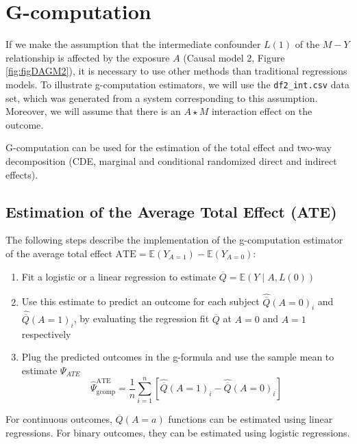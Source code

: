 \documentclass[
]{book}
\begin{document}
\chapter{G-computation}\label{ChapGcomp}

If we make the assumption that the intermediate confounder \(L(1)\) of the \(M-Y\) relationship is affected by the exposure \(A\) (Causal model 2, Figure \ref{fig:figDAGM2}), it is necessary to use other methods than traditional regressions models. To illustrate g-computation estimators, we will use the \texttt{df2\_int.csv} data set, which was generated from a system corresponding to this assumption. Moreover, we will assume that there is an \(A \star M\) interaction effect on the outcome.

G-computation can be used for the estimation of the total effect and two-way decomposition (CDE, marginal and conditional randomized direct and indirect effects).

\section{Estimation of the Average Total Effect (ATE)}\label{estimation-of-the-average-total-effect-ate-1}

The following steps describe the implementation of the g-computation estimator of the average total effect \(\text{ATE} = \mathbb{E}(Y_{A=1}) - \mathbb{E}(Y_{A=0})\):

\begin{enumerate}
\def\labelenumi{\arabic{enumi}.}
\item
  Fit a logistic or a linear regression to estimate \(\overline{Q} = \mathbb{E}(Y \mid A, L(0))\)
\item
  Use this estimate to predict an outcome for each subject \(\hat{\overline{Q}}(A=0)_i\) and \(\hat{\overline{Q}}(A=1)_i\), by evaluating the regression fit \(\overline{Q}\) at \(A=0\) and \(A=1\) respectively
\item
  Plug the predicted outcomes in the g-formula and use the sample mean to estimate \(\Psi_{ATE}\)
  \begin{equation}
  \hat{\Psi}^{\text{ATE}}_{\text{gcomp}} = \frac{1}{n} \sum_{i=1}^n \left[ \hat{\overline{Q}}(A=1)_i - \hat{\overline{Q}}(A=0)_i \right]
  \end{equation}
\end{enumerate}

For continuous outcomes, \(\overline{Q}(A=a)\) functions can be estimated using linear regressions. For binary outcomes, they can be estimated using logistic regressions.
\end{document}
